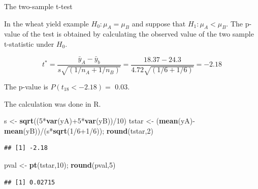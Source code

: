 \documentclass[9pt,ignorenonframetext,]{beamer}
\newenvironment{Shaded}{\begin{snugshade}}{\end{snugshade}}
\newcommand{\KeywordTok}[1]{\textcolor[rgb]{0.13,0.29,0.53}{\textbf{{#1}}}}
\newcommand{\DecValTok}[1]{\textcolor[rgb]{0.00,0.00,0.81}{{#1}}}
\newcommand{\StringTok}[1]{\textcolor[rgb]{0.31,0.60,0.02}{{#1}}}
\newcommand{\NormalTok}[1]{{#1}}
\begin{document}
\begin{frame}[fragile]{The two-sample t-test}

In the wheat yield example \(H_0:\mu_A=\mu_B\) and suppose that
\(H_1: \mu_A < \mu_B.\) The p-value of the test is obtained by
calculating the observed value of the two sample t-statistic under
\(H_0\).

\[ t^{*}= \frac {{\bar y}_A - {\bar y}_b}{s \sqrt{(1/n_A+1/n_B)}} = \frac {18.37 - 24.3}{4.72 \sqrt{(1/6+1/6)}}=-2.18\]

The p-value is \(P(t_{18}<-2.18)=\) 0.03.

The calculation was done in R.

\begin{Shaded}
\begin{Highlighting}[]
\NormalTok{s <-}\StringTok{ }\KeywordTok{sqrt}\NormalTok{((}\DecValTok{5}\NormalTok{*}\KeywordTok{var}\NormalTok{(yA)+}\DecValTok{5}\NormalTok{*}\KeywordTok{var}\NormalTok{(yB))/}\DecValTok{10}\NormalTok{)}
\NormalTok{tstar <-}\StringTok{ }\NormalTok{(}\KeywordTok{mean}\NormalTok{(yA)-}\KeywordTok{mean}\NormalTok{(yB))/(s*}\KeywordTok{sqrt}\NormalTok{(}\DecValTok{1}\NormalTok{/}\DecValTok{6+1}\NormalTok{/}\DecValTok{6}\NormalTok{)); }\KeywordTok{round}\NormalTok{(tstar,}\DecValTok{2}\NormalTok{)}
\end{Highlighting}
\end{Shaded}

\begin{verbatim}
## [1] -2.18
\end{verbatim}

\begin{Shaded}
\begin{Highlighting}[]
\NormalTok{pval <-}\StringTok{ }\KeywordTok{pt}\NormalTok{(tstar,}\DecValTok{10}\NormalTok{); }\KeywordTok{round}\NormalTok{(pval,}\DecValTok{5}\NormalTok{)}
\end{Highlighting}
\end{Shaded}

\begin{verbatim}
## [1] 0.02715
\end{verbatim}

\end{frame}
\end{document}
